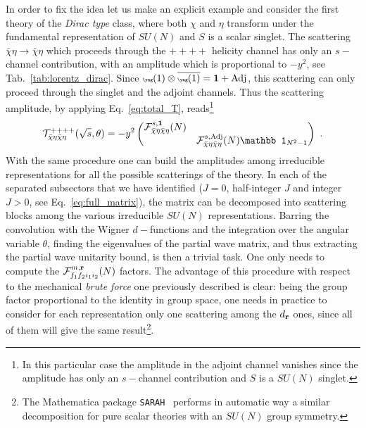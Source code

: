 \documentclass[a4paper,11pt]{article}
\newcommand{\be}{\begin{equation}}
\newcommand{\ee}{\end{equation}}
\begin{document}
In order to fix the idea let us make an explicit example and consider the first theory of the {\emph{Dirac type}} class, where both $\chi$ and $\eta$ transform under the fundamental representation of $SU(N)$ and $S$ is a scalar singlet. The  scattering $\bar\chi \eta \to \bar \chi \eta$ which proceeds through the $++++$ helicity channel has only an $s-$channel contribution, with an amplitude which is proportional to $-y^2$, see Tab.~\ref{tab:lorentz_dirac}. Since ${\tiny{\yng(1)}}\otimes {\overline{{\tiny{\yng(1)}}}}=\mathbf{1}+{\rm Adj}$, this scattering can only proceed through the singlet and the adjoint channels. Thus the scattering amplitude, by applying Eq.~\eqref{eq:total_T},  reads\footnote{In this particular case the amplitude in the adjoint channel vanishes since the amplitude has only an $s-$channel contribution and  $S$ is a $SU(N)$ singlet.}
\be
{\cal T}_{\bar\chi \eta  \bar\chi \eta}^{++++}(\sqrt s,\theta)  = - y^2 
\begin{pmatrix}
{\cal F}^{s,\mathbf{1}}_{\bar\chi \eta  \bar\chi \eta}(N) & \\
& {\cal F}^{s,{\rm Adj}}_{\bar\chi \eta  \bar\chi \eta}(N) {\mathbb 1}_{N^2-1}
\end{pmatrix} \ .
\ee
With the same procedure one can build the amplitudes among irreducible representations for all the possible scatterings of the theory. In each of the separated subsectors that we have identified ($J=0$, half-integer $J$ and integer $J>0$, see Eq.~\eqref{eq:full_matrix}), the matrix can be decomposed into scattering blocks among the various irreducible $SU(N)$ representations. 
Barring the convolution with the Wigner $d-$functions and the integration over the angular variable $\theta$, finding the eigenvalues of the partial wave matrix, and thus extracting the partial wave unitarity bound, is then a trivial task. One only needs to compute the ${\cal F}^{m, {\rm {\bf{r}}}}_{f_1 f_2 i_1 i_2} (N)$ factors.
 The advantage of this procedure with respect to the mechanical {\emph{brute force}}  one previously described is clear: being the group factor proportional to the identity in group space, one needs in practice to consider for each representation only one scattering among the $d_{\bf{r}}$ ones, since all of them will give the same result\footnote{The Mathematica package {\tt SARAH}~\cite{Goodsell:2020rfu} performs in automatic way a similar decomposition for pure scalar theories with an $SU(N)$ group symmetry.}.
\end{document}

